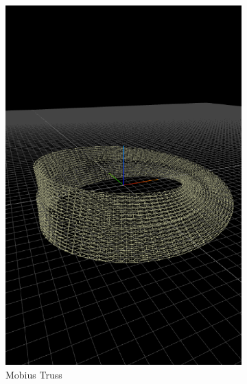 \begin{figure}
  \centering
  \begin{subfigure}[b]{0.25\linewidth}
    \includegraphics[width=1.0\linewidth]{./images/all_examples/trelica_mobius_crop}
    \caption{Mobius Truss}
    \label{fig:ex:mobius}
  \end{subfigure}
  \begin{subfigure}[b]{0.25\linewidth}

\end{subfigure}
\end{figure}
